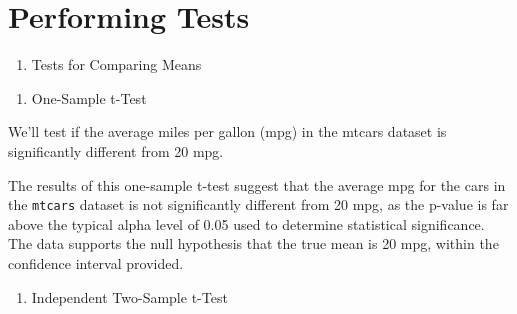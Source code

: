 \documentclass[
]{book}
\newenvironment{Shaded}{\begin{snugshade}}{\end{snugshade}}
\newcommand{\AttributeTok}[1]{\textcolor[rgb]{0.13,0.29,0.53}{#1}}
\newcommand{\CommentTok}[1]{\textcolor[rgb]{0.56,0.35,0.01}{\textit{#1}}}
\newcommand{\DecValTok}[1]{\textcolor[rgb]{0.00,0.00,0.81}{#1}}
\newcommand{\FunctionTok}[1]{\textcolor[rgb]{0.13,0.29,0.53}{\textbf{#1}}}
\newcommand{\NormalTok}[1]{#1}
\newcommand{\SpecialCharTok}[1]{\textcolor[rgb]{0.81,0.36,0.00}{\textbf{#1}}}
\providecommand{\tightlist}{%
  \setlength{\itemsep}{0pt}\setlength{\parskip}{0pt}}
\begin{document}
\section*{Performing Tests}\label{performing-tests}

\begin{enumerate}
\def\labelenumi{\arabic{enumi}.}
\tightlist
\item
  Tests for Comparing Means
\end{enumerate}

\begin{enumerate}
\def\labelenumi{\alph{enumi}.}
\tightlist
\item
  One-Sample t-Test
\end{enumerate}

We'll test if the average miles per gallon (mpg) in the mtcars dataset is significantly different from 20 mpg.

\begin{Shaded}
\end{Shaded}

The results of this one-sample t-test suggest that the average mpg for the cars in the \texttt{mtcars} dataset is not significantly different from 20 mpg, as the p-value is far above the typical alpha level of 0.05 used to determine statistical significance. The data supports the null hypothesis that the true mean is 20 mpg, within the confidence interval provided.

\begin{enumerate}
\def\labelenumi{\alph{enumi}.}
\setcounter{enumi}{1}
\tightlist
\item
  Independent Two-Sample t-Test
\end{enumerate}
\end{document}
